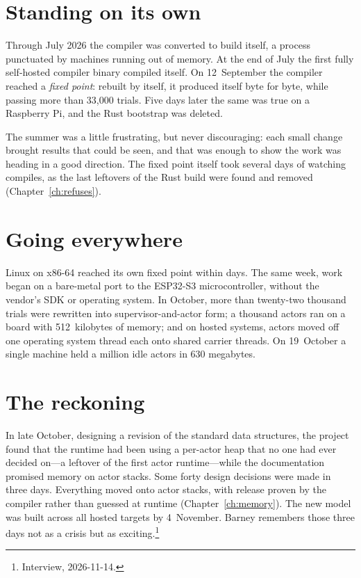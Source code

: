 \section{Standing on its own}

Through July 2026 the compiler was converted to build itself, a process
punctuated by machines running out of memory. At the end of July the first
fully self-hosted compiler binary compiled itself. On 12~September the compiler
reached a \emph{fixed point}: rebuilt by itself, it produced itself byte for
byte, while passing more than 33,000 trials. Five days later the same was true
on a Raspberry Pi, and the Rust bootstrap was deleted.

The summer was a little frustrating, but never discouraging: each small change
brought results that could be seen, and that was enough to show the work was
heading in a good direction. The fixed point itself took several days of
watching compiles, as the last leftovers of the Rust build were found and
removed (Chapter~\ref{ch:refuses}).

\section{Going everywhere}

Linux on x86-64 reached its own fixed point within days. The same week, work
began on a bare-metal port to the ESP32-S3 microcontroller, without the vendor's
SDK or operating system. In October, more than twenty-two thousand trials were
rewritten into supervisor-and-actor form; a thousand actors ran on a board with
512~kilobytes of memory; and on hosted systems, actors moved off one operating
system thread each onto shared carrier threads. On 19~October a single machine
held a million idle actors in 630 megabytes.

\section{The reckoning}

In late October, designing a revision of the standard data structures, the
project found that the runtime had been using a per-actor heap that no one had
ever decided on---a leftover of the first actor runtime---while the documentation
promised memory on actor stacks. Some forty design decisions were made in three
days. Everything moved onto actor stacks, with release proven by the compiler
rather than guessed at runtime (Chapter~\ref{ch:memory}). The new model was
built across all hosted targets by 4~November. Barney remembers those three
days not as a crisis but as exciting.\footnote{Interview, 2026-11-14.}


